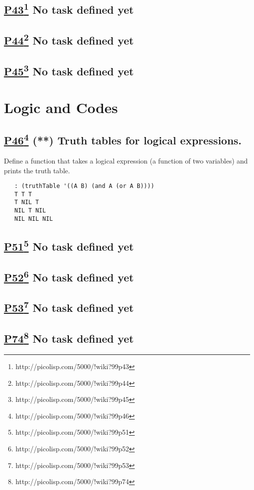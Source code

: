 \documentclass[10pt,a4paper]{article}
\begin{document}
\subsection*{\underline{P43}\footnote{http://picolisp.com/5000/!wiki?99p43} No task defined yet}
\subsection*{\underline{P44}\footnote{http://picolisp.com/5000/!wiki?99p44} No task defined yet}
\subsection*{\underline{P45}\footnote{http://picolisp.com/5000/!wiki?99p45} No task defined yet}

\section*{Logic and Codes}

\subsection*{\underline{P46}\footnote{http://picolisp.com/5000/!wiki?99p46} (**) Truth tables for logical expressions.}
Define a function that takes a logical expression (a function of two variables)
and prints the truth table.
\begin{verbatim}
   : (truthTable '((A B) (and A (or A B))))
   T T T
   T NIL T
   NIL T NIL
   NIL NIL NIL
\end{verbatim}


\subsection*{\underline{P51}\footnote{http://picolisp.com/5000/!wiki?99p51} No task defined yet}
\subsection*{\underline{P52}\footnote{http://picolisp.com/5000/!wiki?99p52} No task defined yet}
\subsection*{\underline{P53}\footnote{http://picolisp.com/5000/!wiki?99p53} No task defined yet}

\subsection*{\underline{P74}\footnote{http://picolisp.com/5000/!wiki?99p74} No task defined yet}
\end{document}
